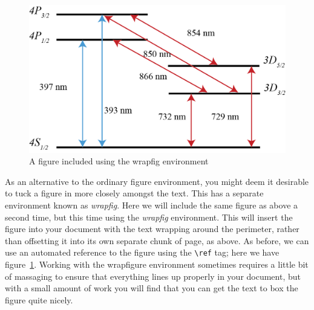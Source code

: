 \begin{figure}
\centering
\vspace{-.1\baselineskip}
\includegraphics[width=.4\textwidth]{Chapters/Figures/calcium_levels_1-1.PNG}
\caption[Another short-form caption]{A figure included using the wrapfig environment}
\label{fig:anotherFigure}
\end{figure}
As an alternative to the ordinary figure environment, you might deem it desirable to tuck a figure in more closely amongst the text.  This has a separate environment known as \emph{wrapfig}.  Here we will include the same figure as above a second time, but this time using the \emph{wrapfig} environment.  This will insert the figure into your document with the text wrapping around the perimeter, rather than offsetting it into its own separate chunk of page, as above.    As before, we can use an automated reference to the figure using the \texttt{\textbackslash ref} tag; here we have figure~\ref{fig:anotherFigure}.  Working with the wrapfigure environment sometimes requires a little bit of massaging to ensure that everything lines up properly in your document, but with a small amount of work  you will find that you can get the text to box the figure quite nicely.

